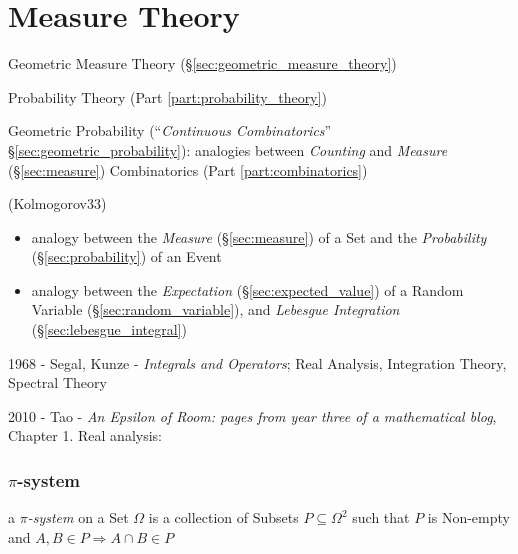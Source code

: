 \part{Measure Theory}\label{part:measure_theory}

\fist Geometric Measure Theory (\S\ref{sec:geometric_measure_theory})

\fist Probability Theory (Part \ref{part:probability_theory})

\fist Geometric Probability (``\emph{Continuous Combinatorics}''
\S\ref{sec:geometric_probability}): analogies between \emph{Counting} and
\emph{Measure} (\S\ref{sec:measure}) \fist Combinatorics (Part
\ref{part:combinatorics})

(Kolmogorov33)

\begin{itemize}
  \item analogy between the \emph{Measure} (\S\ref{sec:measure}) of a Set and
    the \emph{Probability} (\S\ref{sec:probability}) of an Event
  \item analogy between the \emph{Expectation} (\S\ref{sec:expected_value}) of a
    Random Variable (\S\ref{sec:random_variable}), and \emph{Lebesgue
      Integration} (\S\ref{sec:lebesgue_integral})
\end{itemize}

1968 - Segal, Kunze - \emph{Integrals and Operators}; Real Analysis, Integration
Theory, Spectral Theory

2010 - Tao - \emph{An Epsilon of Room: pages from year three of a mathematical
  blog}, Chapter 1. Real analysis:



\section{$\pi$-system}\label{sec:pi_system}

a \emph{$\pi$-system} on a Set $\Omega$ is a collection of Subsets
$P \subseteq \Omega^2$ such that $P$ is Non-empty and
$A, B \in P \Rightarrow A \cap B \in P$




